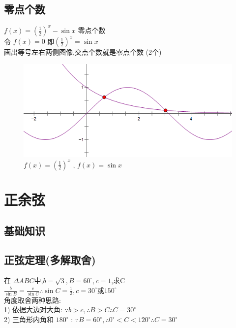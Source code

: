 \documentclass[hyperref, UTF8,11pt,a4paper]{ctexart} %
\begin{document}
\subsection {零点个数}
{\color{red}  $f(x)=\left(\frac{1}{2}\right)^{x}-\sin x$ 零点个数} \\
令 $f(x)=0$ 即$\left(\frac{1}{2}\right)^{x}=\sin x$ \\
画出等号左右两侧图像,交点个数就是零点个数 (2个)
\begin{figure}[h] %
	\begin{center}
		\includegraphics[scale=0.5]  {pic/sanjiaohanshu/lingdiangeshu.png}
		\caption{$f(x)=\left(\frac{1}{2}\right)^{x}$ , $f(x)=\sin x$}
	\end{center}
\end{figure}

\newpage
\section{正余弦}
\subsection*{基础知识}
\subsection{正弦定理(多解取舍)}
{\color{red} 在 $\Delta A B C$中,$b=\sqrt{3}, B=60^{\circ}, c=1$,求C } \\
$ \frac{b}{\sin B}=\frac{c}{\sin C} \therefore \sin C=\frac{1}{2}, c=30^{\circ}$或$150^{\circ}$ \\
角度取舍两种思路:\\
1) 依据大边对大角:  \quad
$\because b>c,  \therefore B>C \therefore C=30^{\circ}$ \\
2) 三角形内角和 $180^{\circ}$ : \quad
$ \because   B=60^{\circ}, \therefore 0^{\circ}<C<120^{\circ}  \therefore C=30^{\circ}$ \\
\end{document}
